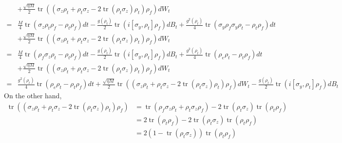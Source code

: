 \documentclass[]{elsarticle}
\begin{document}
\begin{appendices}
\begin{equation}
\begin{aligned}
		&+\frac{\sqrt{\eta M}}{2} \operatorname{tr}\left(\left(\sigma_z \rho_t+\rho_t \sigma_z-2 \operatorname{tr}\left(\rho_t \sigma_z\right) \rho_t\right)\rho_{f}\right) d W_t\\
		=&\frac{M}{4}\operatorname{tr}\left(\sigma_z \rho_t\rho_f-\rho_t\rho_f\right) d t-\frac{g\left(\rho_t\right)}{2}\operatorname{tr}\left({{i}}\left[\sigma_y, \rho_t\right]\rho_{f}\right) d B_t
		+\frac{g^2\left(\rho_t\right)}{4}\operatorname{tr}\left(\sigma_y\rho_f\sigma_y \rho_t-\rho_t\rho_{f}\right)d t\\
		&+\frac{\sqrt{\eta M}}{2} \operatorname{tr}\left(\left(\sigma_z \rho_t+\rho_t \sigma_z-2 \operatorname{tr}\left(\rho_t \sigma_z\right) \rho_t\right)\rho_{f}\right) d W_t\\
		=&\frac{M}{4}\operatorname{tr}\left(\rho_f\sigma_z \rho_t-\rho_t\rho_f\right) d t-\frac{g\left(\rho_t\right)}{2}\operatorname{tr}\left({{i}}\left[\sigma_y, \rho_t\right]\rho_{f}\right) d B_t+\frac{g^2\left(\rho_t\right)}{4}\operatorname{tr}\left(\rho_e\rho_t-\rho_t\rho_{f}\right)d t\\
		&+\frac{\sqrt{\eta M}}{2} \operatorname{tr}\left(\left(\sigma_z \rho_t+\rho_t \sigma_z-2 \operatorname{tr}\left(\rho_t \sigma_z\right) \rho_t\right)\rho_{f}\right) d W_t\\
		=&\frac{g^2\left(\rho_t\right)}{4}\operatorname{tr}\left(\rho_e\rho_t-\rho_t\rho_{f}\right)d t+\frac{\sqrt{\eta M}}{2} \operatorname{tr}\left(\left(\sigma_z \rho_t+\rho_t \sigma_z-2 \operatorname{tr}\left(\rho_t \sigma_z\right) \rho_t\right)\rho_{f}\right) d W_t
		-\frac{g\left(\rho_t\right)}{2}\operatorname{tr}\left({{i}}\left[\sigma_y, \rho_t\right]\rho_{f}\right) d B_t
	\end{aligned}
\end{equation}
On the other hand, 
\begin{equation}\label{eq:assApp_2}
	\begin{aligned}
		\operatorname{tr}\left(\left(\sigma_z \rho_t+\rho_t \sigma_z-2 \operatorname{tr}\left(\rho_t \sigma_z\right) \rho_t\right)\rho_{f}\right)
		&=\operatorname{tr}\left(\rho_f\sigma_z \rho_t+\rho_t \sigma_z\rho_f\right)-2 \operatorname{tr}\left(\rho_t \sigma_z\right)\operatorname{tr}\left( \rho_t\rho_f\right)\\
		&=2\operatorname{tr}\left(\rho_t\rho_f\right)-2 \operatorname{tr}\left(\rho_t \sigma_z\right)\operatorname{tr}\left( \rho_t\rho_f\right)\\
		&=2\left(1-\operatorname{tr}\left(\rho_t \sigma_z\right)\right)\operatorname{tr}\left(\rho_t\rho_f\right)
	\end{aligned}

\end{equation}
\end{appendices}
\end{document}
